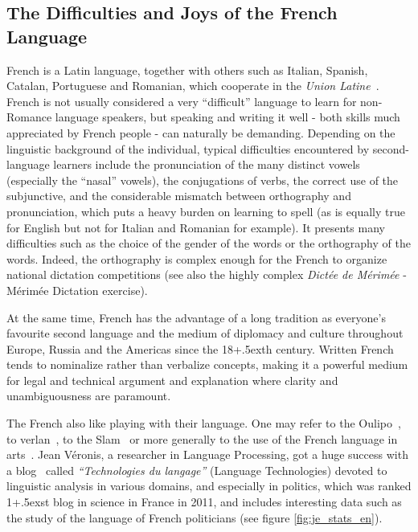 \begin{multicols}{2}
\subsection{The Difficulties and Joys of the French Language}
French is a Latin language, together with others such as Italian,
Spanish, Catalan, Portuguese and Romanian, which cooperate in the
{\em Union Latine}~\cite{ulatine}. French is not usually considered a very ``difficult''
language to learn for non-Romance language speakers, but speaking and
writing it well - both skills much appreciated by French people - can
naturally be demanding. Depending on the linguistic background of the
individual, typical difficulties encountered by second-language
learners include the pronunciation of the many distinct vowels
(especially the ``nasal'' vowels), the conjugations of verbs, the
correct use of the subjunctive, and the considerable mismatch between
orthography and pronunciation, which puts a heavy burden on learning
to spell (as is equally true for English but not for Italian and
Romanian for example). It presents many difficulties such as the
choice of the gender of the words or the orthography of the
words. Indeed, the orthography is complex enough for the French to
organize national dictation competitions (see also the highly complex
{\em Dictée de Mérimée} - Mérimée Dictation exercise).  

At the same time, French has the advantage of a long tradition as
everyone's favourite second language and the medium of diplomacy and
culture throughout Europe, Russia and the Americas since the 18\raise+.5ex\hbox{th}
century. Written French tends to nominalize rather than verbalize
concepts, making it a powerful medium for legal and technical argument
and explanation where clarity and unambiguousness are paramount.

The French also like playing with their language. One may refer to the
Oulipo~\cite{oulipo}, to verlan~\cite{plenat95}, to the Slam~\cite{slam} or more generally to the use of the
French language in arts~\cite{arts}. Jean Véronis, a researcher in Language
Processing, got a huge success with a blog~\cite{veronis} called {\em ``Technologies du
langage''} (Language Technologies) devoted to linguistic analysis in various domains, and
especially in politics, which was ranked 1\raise+.5ex\hbox{st} blog in science in France
in 2011, and includes interesting data such as the study of the
language of French politicians (see figure \ref{fig:je_stats_en}).


\end{multicols}

